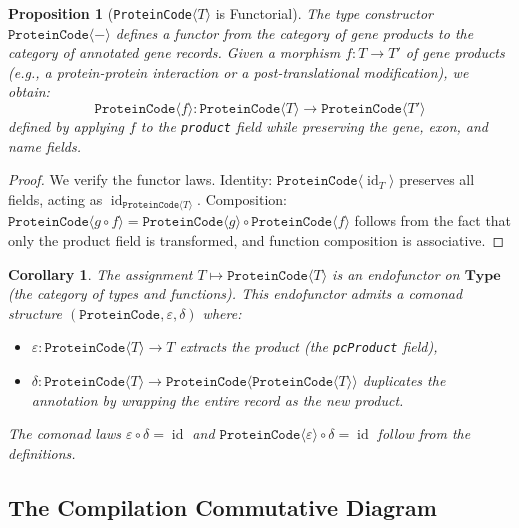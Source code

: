 \documentclass[12pt,a4paper]{article}
\newtheorem{proposition}[theorem]{Proposition}
\newtheorem{corollary}[theorem]{Corollary}
\theoremstyle{definition}
\newcommand{\ProteinCode}{\texttt{ProteinCode}\ensuremath{\langle T \rangle}}
\newcommand{\cat}[1]{\mathbf{#1}}
\newcommand{\id}{\operatorname{id}}
\begin{document}
\begin{proposition}[\ProteinCode{} is Functorial]\label{prop:proteincode-functor}
The type constructor $\texttt{ProteinCode}\langle - \rangle$ defines a functor from the category of gene products to the category of annotated gene records. Given a morphism $f : T \to T'$ of gene products (e.g., a protein-protein interaction or a post-translational modification), we obtain:
\[
  \texttt{ProteinCode}\langle f \rangle : \texttt{ProteinCode}\langle T \rangle \to \texttt{ProteinCode}\langle T' \rangle
\]
defined by applying $f$ to the \texttt{product} field while preserving the gene, exon, and name fields.
\end{proposition}

\begin{proof}
We verify the functor laws. Identity: $\texttt{ProteinCode}\langle \id_T \rangle$ preserves all fields, acting as $\id_{\texttt{ProteinCode}\langle T \rangle}$. Composition: $\texttt{ProteinCode}\langle g \circ f \rangle = \texttt{ProteinCode}\langle g \rangle \circ \texttt{ProteinCode}\langle f \rangle$ follows from the fact that only the product field is transformed, and function composition is associative.
\end{proof}

\begin{corollary}\label{cor:comonad}
The assignment $T \mapsto \texttt{ProteinCode}\langle T \rangle$ is an endofunctor on $\cat{Type}$ (the category of types and functions). This endofunctor admits a comonad structure $(\texttt{ProteinCode}, \varepsilon, \delta)$ where:
\begin{itemize}
  \item $\varepsilon \colon \texttt{ProteinCode}\langle T \rangle \to T$ extracts the product (the \texttt{pcProduct} field),
  \item $\delta \colon \texttt{ProteinCode}\langle T \rangle \to \texttt{ProteinCode}\langle \texttt{ProteinCode}\langle T \rangle \rangle$ duplicates the annotation by wrapping the entire record as the new product.
\end{itemize}
The comonad laws $\varepsilon \circ \delta = \id$ and $\texttt{ProteinCode}\langle \varepsilon \rangle \circ \delta = \id$ follow from the definitions.
\end{corollary}

\subsection{The Compilation Commutative Diagram}
\end{document}
